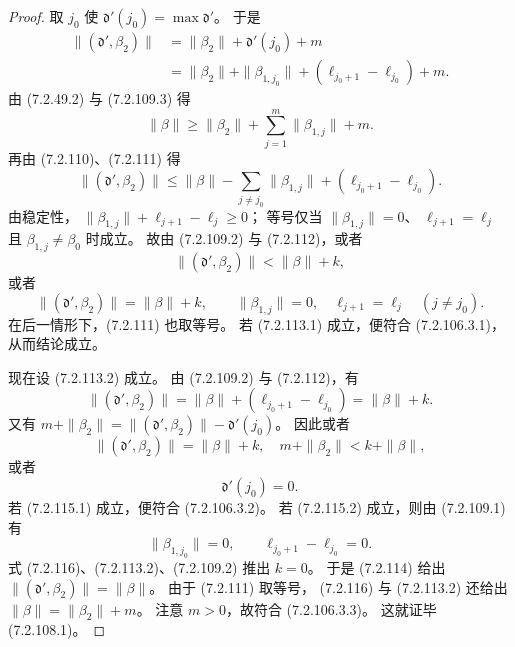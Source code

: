 \begin{proof}
取 $j_0$ 使
$\mathfrak d'(j_0)=\max\mathfrak d'$。
于是
\begin{equation}
\begin{aligned}
\|(\mathfrak d',\beta_2)\|
&=\|\beta_2\|+\mathfrak d'(j_0)+m\\
&=\|\beta_2\|+\|\beta_{1,j_0}\|
+(\ell_{j_0+1}-\ell_{j_0})+m.
\end{aligned}
\tag{7.2.110}\label{eq:7-2-110}
\end{equation}
由 (7.2.49.2) 与 (7.2.109.3) 得
\begin{equation}
\|\beta\|\ge\|\beta_2\|
+\sum_{j=1}^{m}\|\beta_{1,j}\|+m.
\tag{7.2.111}\label{eq:7-2-111}
\end{equation}
再由 (7.2.110)、(7.2.111) 得
\begin{equation}
\|(\mathfrak d',\beta_2)\|
\le\|\beta\|-\sum_{j\ne j_0}\|\beta_{1,j}\|
+(\ell_{j_0+1}-\ell_{j_0}).
\tag{7.2.112}\label{eq:7-2-112}
\end{equation}
由稳定性，
$\|\beta_{1,j}\|+\ell_{j+1}-\ell_j\ge0$；
等号仅当
$\|\beta_{1,j}\|=0$、
$\ell_{j+1}=\ell_j$ 且
$\beta_{1,j}\ne\beta_0$ 时成立。
故由 (7.2.109.2) 与 (7.2.112)，或者
\begin{equation}
\|(\mathfrak d',\beta_2)\|<\|\beta\|+k,
\tag{7.2.113.1}\label{eq:7-2-113-1}
\end{equation}
或者
\begin{equation}
\|(\mathfrak d',\beta_2)\|=\|\beta\|+k,
\qquad
\|\beta_{1,j}\|=0,\quad\ell_{j+1}=\ell_j
\quad(j\ne j_0).
\tag{7.2.113.2}\label{eq:7-2-113-2}
\end{equation}
在后一情形下，(7.2.111) 也取等号。
若 (7.2.113.1) 成立，便符合 (7.2.106.3.1)，
从而结论成立。

现在设 (7.2.113.2) 成立。
由 (7.2.109.2) 与 (7.2.112)，有
\begin{equation}
\|(\mathfrak d',\beta_2)\|
=\|\beta\|+(\ell_{j_0+1}-\ell_{j_0})
=\|\beta\|+k.
\tag{7.2.114}\label{eq:7-2-114}
\end{equation}
又有
$m+\|\beta_2\|
=\|(\mathfrak d',\beta_2)\|-\mathfrak d'(j_0)$。
因此或者
\begin{equation}
\|(\mathfrak d',\beta_2)\|=\|\beta\|+k,
\quad m+\|\beta_2\|<k+\|\beta\|,
\tag{7.2.115.1}\label{eq:7-2-115-1}
\end{equation}
或者
\begin{equation}
\mathfrak d'(j_0)=0.
\tag{7.2.115.2}\label{eq:7-2-115-2}
\end{equation}
若 (7.2.115.1) 成立，便符合 (7.2.106.3.2)。
若 (7.2.115.2) 成立，则由 (7.2.109.1) 有
\begin{equation}
\|\beta_{1,j_0}\|=0,
\qquad \ell_{j_0+1}-\ell_{j_0}=0.
\tag{7.2.116}\label{eq:7-2-116}
\end{equation}
式 (7.2.116)、(7.2.113.2)、(7.2.109.2)
推出 $k=0$。
于是 (7.2.114) 给出
$\|(\mathfrak d',\beta_2)\|=\|\beta\|$。
由于 (7.2.111) 取等号，
(7.2.116) 与 (7.2.113.2) 还给出
$\|\beta\|=\|\beta_2\|+m$。
注意 $m>0$，故符合 (7.2.106.3.3)。
这就证毕 (7.2.108.1)。


\end{proof}
